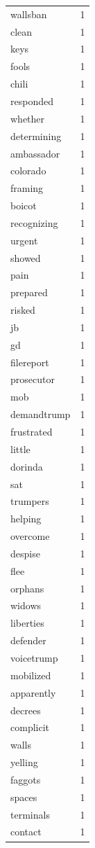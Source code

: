 \begin{tabular}{lr}
wallsban & 1 \\
clean & 1 \\
keys & 1 \\
fools & 1 \\
chili & 1 \\
responded & 1 \\
whether & 1 \\
determining & 1 \\
ambassador & 1 \\
colorado & 1 \\
framing & 1 \\
boicot & 1 \\
recognizing & 1 \\
urgent & 1 \\
showed & 1 \\
pain & 1 \\
prepared & 1 \\
risked & 1 \\
jb & 1 \\
gd & 1 \\
filereport & 1 \\
prosecutor & 1 \\
mob & 1 \\
demandtrump & 1 \\
frustrated & 1 \\
little & 1 \\
dorinda & 1 \\
sat & 1 \\
trumpers & 1 \\
helping & 1 \\
overcome & 1 \\
despise & 1 \\
flee & 1 \\
orphans & 1 \\
widows & 1 \\
liberties & 1 \\
defender & 1 \\
voicetrump & 1 \\
mobilized & 1 \\
apparently & 1 \\
decrees & 1 \\
complicit & 1 \\
walls & 1 \\
yelling & 1 \\
faggots & 1 \\
spaces & 1 \\
terminals & 1 \\
contact & 1 \\

\end{tabular}
